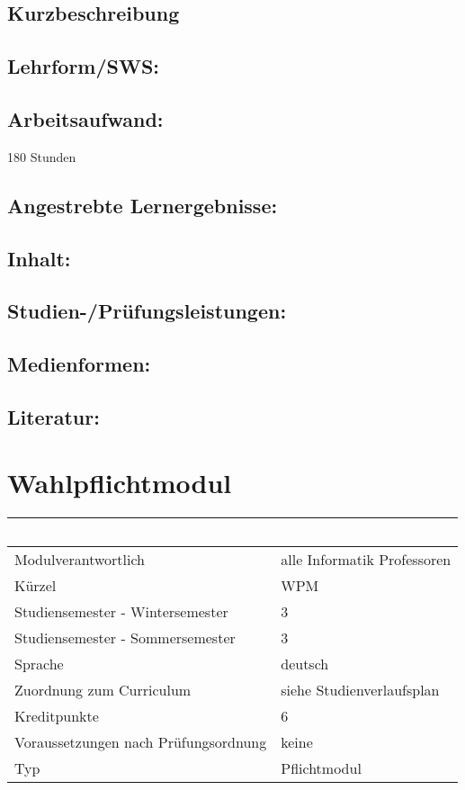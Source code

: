 \section*{Kurzbeschreibung}\label{kurzbeschreibung-6}

\section*{Lehrform/SWS:}\label{lehrformsws-7}

\section*{Arbeitsaufwand:}\label{arbeitsaufwand-7}

180 Stunden

\section*{Angestrebte
Lernergebnisse:}\label{angestrebte-lernergebnisse-7}

\section*{Inhalt:}\label{inhalt-7}

\section*{Studien-/Prüfungsleistungen:}\label{studien-pruxfcfungsleistungen-7}

\section*{Medienformen:}\label{medienformen-7}

\section*{Literatur:}\label{literatur-7}

\chapter{Wahlpflichtmodul}\label{wahlpflichtmodul-2}

\begin{longtable}[]{@{}ll@{}}
\toprule
~ & ~\tabularnewline
\midrule
\endhead
Modulverantwortlich & alle Informatik Professoren\tabularnewline
Kürzel & WPM\tabularnewline
Studiensemester - Wintersemester & 3\tabularnewline
Studiensemester - Sommersemester & 3\tabularnewline
Sprache & deutsch\tabularnewline
Zuordnung zum Curriculum & siehe Studienverlaufsplan\tabularnewline
Kreditpunkte & 6\tabularnewline
Voraussetzungen nach Prüfungsordnung & keine\tabularnewline
Typ & Pflichtmodul\tabularnewline
\bottomrule
\end{longtable}

